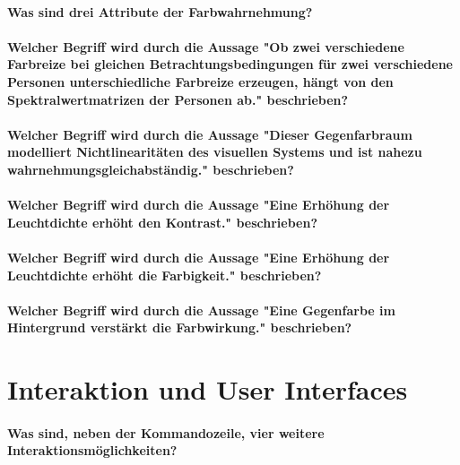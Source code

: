		\paragraph{Was sind drei Attribute der Farbwahrnehmung?}

		\paragraph{Welcher Begriff wird durch die Aussage "Ob zwei verschiedene Farbreize bei gleichen Betrachtungsbedingungen für zwei verschiedene Personen unterschiedliche Farbreize erzeugen, hängt von den Spektralwertmatrizen der Personen ab." beschrieben?}

		\paragraph{Welcher Begriff wird durch die Aussage "Dieser Gegenfarbraum modelliert Nichtlinearitäten des visuellen Systems und ist nahezu wahrnehmungsgleichabständig." beschrieben?}

		\paragraph{Welcher Begriff wird durch die Aussage "Eine Erhöhung der Leuchtdichte erhöht den Kontrast." beschrieben?}

		\paragraph{Welcher Begriff wird durch die Aussage "Eine Erhöhung der Leuchtdichte erhöht die Farbigkeit." beschrieben?}

		\paragraph{Welcher Begriff wird durch die Aussage "Eine Gegenfarbe im Hintergrund verstärkt die Farbwirkung." beschrieben?}

	\section{Interaktion und User Interfaces}
		\paragraph{Was sind, neben der Kommandozeile, vier weitere Interaktionsmöglichkeiten?}

